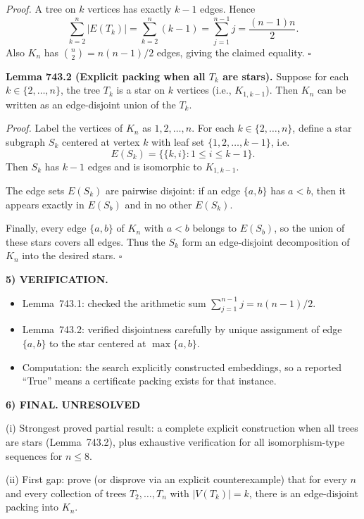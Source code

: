 \noindent\emph{Proof.}
A tree on $k$ vertices has exactly $k-1$ edges. Hence
\[
\sum_{k=2}^n |E(T_k)|=\sum_{k=2}^n (k-1)=\sum_{j=1}^{n-1} j = \frac{(n-1)n}{2}.
\]
Also $K_n$ has $\binom{n}{2}=n(n-1)/2$ edges, giving the claimed equality. \hfill $\square$

\medskip
\noindent\textbf{Lemma 743.2 (Explicit packing when all $T_k$ are stars).}
Suppose for each $k\in\{2,\dots,n\}$, the tree $T_k$ is a star on $k$ vertices (i.e., $K_{1,k-1}$). Then $K_n$ can be written as an edge-disjoint union of the $T_k$.

\noindent\emph{Proof.}
Label the vertices of $K_n$ as $1,2,\dots,n$.
For each $k\in\{2,\dots,n\}$, define a star subgraph $S_k$ centered at vertex $k$ with leaf set $\{1,2,\dots,k-1\}$, i.e.
\[
E(S_k)=\{\{k,i\}: 1\le i\le k-1\}.
\]
Then $S_k$ has $k-1$ edges and is isomorphic to $K_{1,k-1}$.

The edge sets $E(S_k)$ are pairwise disjoint: if an edge $\{a,b\}$ has $a<b$, then it appears exactly in $E(S_b)$ and in no other $E(S_k)$.

Finally, every edge $\{a,b\}$ of $K_n$ with $a<b$ belongs to $E(S_b)$, so the union of these stars covers all edges. Thus the $S_k$ form an edge-disjoint decomposition of $K_n$ into the desired stars. \hfill $\square$

\medskip
\noindent\textbf{5) VERIFICATION.}

\begin{itemize}
\item Lemma~743.1: checked the arithmetic sum $\sum_{j=1}^{n-1} j=n(n-1)/2$.
\item Lemma~743.2: verified disjointness carefully by unique assignment of edge $\{a,b\}$ to the star centered at $\max\{a,b\}$.
\item Computation: the search explicitly constructed embeddings, so a reported ``True'' means a certificate packing exists for that instance.
\end{itemize}

\medskip
\noindent\textbf{6) FINAL.} \textbf{UNRESOLVED}

(i) Strongest proved partial result: a complete explicit construction when all trees are stars (Lemma~743.2), plus exhaustive verification for all isomorphism-type sequences for $n\le 8$.

(ii) First gap: prove (or disprove via an explicit counterexample) that for every $n$ and every collection of trees $T_2,\dots,T_n$ with $|V(T_k)|=k$, there is an edge-disjoint packing into $K_n$.


